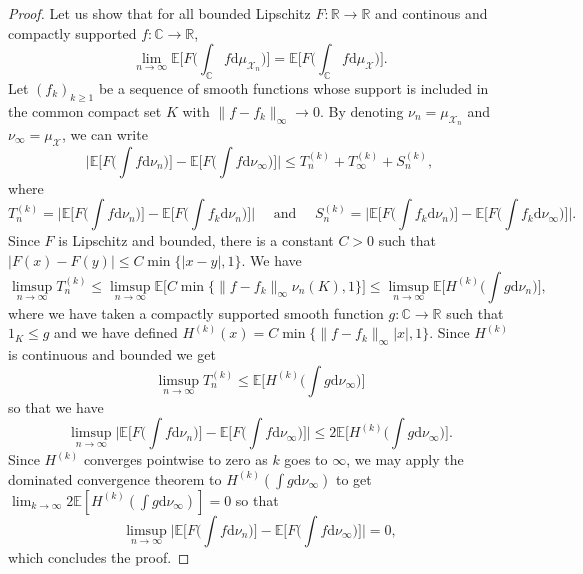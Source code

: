 \documentclass[10pt,reqno]{amsart}
\newcommand{\<}{\langle}
\renewcommand{\>}{\rangle}
\numberwithin{equation}{section}
\begin{document}
\begin{proof}
Let us show that for all bounded Lipschitz $F: \mathbb R \to \mathbb R$ and continous and compactly supported $f: \mathbb C \to \mathbb R$,
\[\lim_{n \to \infty}\mathbb E\Big[F\Big(\int_{\mathbb C} f \mathrm d \mu_{\mathcal X_n} 
\Big) \Big]=
\mathbb E\Big[F\Big(\int_{\mathbb C} f \mathrm d \mu_{\mathcal X} 
\Big) \Big].
\]
Let $(f_k)_{k \geq 1}$ 
be a sequence of smooth functions whose support 
is included in the common compact set $K$ with
$\|f-f_k\|_{\infty} \to 0$. 
By denoting
$\nu_n = \mu_{\mathcal X_n}$ and $\nu_{\infty} = \mu_{\mathcal X}$,
we can write
\[
\Big|\mathbb{E}\Bigr[F\Bigr(\int f\mathrm d \nu_n\Bigr)\Bigr]
-
\mathbb{E}\Bigr[F\Bigr(\int f \mathrm d \nu_\infty\Bigr)\Bigr] \Big|
\leq T_n^{(k)} + T_\infty^{(k)} + S_n^{(k)},
\]
where
\[T_n^{(k)} = \Big|\mathbb{E}\Bigr[F\Bigr(\int f
\mathrm d \nu_n\Bigr)\Bigr]
-
\mathbb{E}\Bigr[F\Bigr(\int f_k \mathrm d \nu_n\Bigr)\Bigr] \Big|
\quad \mbox{ and }\quad 
S^{(k)}_n = \Big|\mathbb{E}\Bigr[F\Bigr(\int f_k
\mathrm d \nu_n\Bigr)\Bigr]
-
\mathbb{E}\Bigr[F\Bigr(\int f_k \mathrm d \nu_\infty\Bigr)\Bigr] \Big|.
 \] 
Since $F$ is Lipschitz and bounded, there is a constant $C>0$ 
such that
$|F(x) - F(y)| \leq C \min \{|x-y|,1\} $. We have
\[\limsup_{n \to \infty} T_n^{(k)} \leq 
\limsup_{n \to \infty} \mathbb E\big[C\min\big\{\|f - f_k \|_{\infty}
\nu_n(K), 1\big\} \big]
\leq 
\limsup_{n \to \infty} 
\mathbb E \Big[H^{(k)}\Big(\int g \mathrm d \nu_n\Big) \Big],\]
where we have 
taken a compactly supported smooth function
$g: \mathbb C \to \mathbb R$ such that
$1_K \leq g$ and we have
defined $H^{(k)}(x) = C \min\{\|f-f_k\|_{\infty} |x|,1\}$.
Since $H^{(k)}$ is continuous and bounded we get
\[\limsup_{n \to \infty} T_n^{(k)} \leq 
\mathbb E \Big[H^{(k)}\Big(\int g \mathrm d \nu_\infty\Big) \Big]\]
so that we have
\[\limsup_{n \to \infty} \Big|\mathbb{E}\Bigr[F\Bigr(\int f\mathrm d \nu_n\Bigr)\Bigr]
-
\mathbb{E}\Bigr[F\Bigr(\int f \mathrm d \nu_\infty\Bigr)\Bigr] \Big|
\leq 
2\mathbb E \Big[H^{(k)}\Big(\int g \mathrm d \nu_\infty\Big) \Big].\]
Since $H^{(k)}$ converges pointwise to zero as $k$ goes to $\infty$, we may apply the dominated convergence theorem to
$H^{(k)}(\int g \mathrm d \nu_{\infty})$ to get
$\lim_{k \to \infty} 
2\mathbb E [H^{(k)}(\int g \mathrm d \nu_\infty) ] = 0$ so that
\[\limsup_{n \to \infty} \Big|\mathbb{E}\Bigr[F\Bigr(\int f\mathrm d \nu_n\Bigr)\Bigr]
-
\mathbb{E}\Bigr[F\Bigr(\int f \mathrm d \nu_\infty\Bigr)\Bigr] \Big|
= 0,\]
which concludes the proof.

\end{proof}
\end{document}
